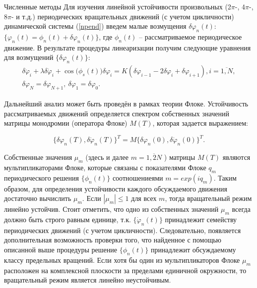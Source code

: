 \begin{chapter}{Численные методы}
Для изучения линейной устойчивости произвольных (2$\pi$-, 4$\pi$-, 8$\pi$- и т.д.) 
периодических вращательных движений (с учетом цикличности) динамической 
системы (\ref{npend}) введем малые возмущения 
$\delta \varphi_n(t)$:  $ \{ \varphi_n(t) = \phi_n(t) + \delta \varphi_n(t) \} $, где $ \phi_n(t) $ -- рассматриваемое периодическое движение.
В результате процедуры линеаризации получим следующие 
уравнения для возмущений $ \{ \delta \varphi_n(t) \} $:
\begin{equation*}
	\begin{gathered} 
		\delta \ddot{\varphi}_i + \lambda \delta \dot{\varphi}_i+ \cos{(\phi_s(t)})\delta \varphi_i =  K ( \delta \varphi_{i-1}- 2\delta \varphi_i + \delta \varphi_{i+1 } ), i = \overline{1,N}, \\
		\delta \varphi_N = \delta \varphi_{N+1}, \ \delta\varphi_1 = \delta \varphi_0.
	\end{gathered}
\end{equation*}

Дальнейший анализ может быть проведён в рамках теории Флоке. 
Устойчивость рассматриваемых движений определяется спектром 
собственных значений матрицы монодромии (оператора Флоке) $M(T)$, которая задается выражением:

\begin{equation*}
	\{\delta \varphi_n(T),\delta \dot{\varphi}_n(T)\}^T = M\{\delta \varphi_n(0),\delta \dot{\varphi}_n(0)\}^T. 
\end{equation*}

Собственные значения $ \mu_m $ (здесь и далее $m=\overline{1,2N}$ ) матрицы $M(T)$ 
являются мультипликаторами Флоке, которые связаны с показателями 
Флоке $q_m$ периодического решения $\{\phi_n(t)\}$ соотношениеями $m=exp(iq_m) $. 
Таким образом, для определения устойчивости каждого обсуждаемого 
движения достаточно вычислить $\mu_m$. Если $|\mu_m| \leq 1 $ для всех $m$, тогда 
вращательный режим линейно устойчив. Стоит отметить, что одно 
из собственных значений $\mu_m$ всегда должно быть строго равным 
единице, т.к. $\{ \dot{\varphi}_n(t) \}$ принадлежит семейству периодических движений 
(с учетом цикличности). Следовательно, появляется дополнительная 
возможность проверки того, что найденное с помощью описанной 
выше процедуры решение $\{ \phi_n(t) \}$ принадлежит обсуждаемому классу 
предельных вращений. Если хотя бы один из мультипликаторов 
Флоке $\mu_m$ расположен на комплексной плоскости за пределами 
единичной окружности, то вращательный режим является линейно 
неустойчивым.
\end{chapter}